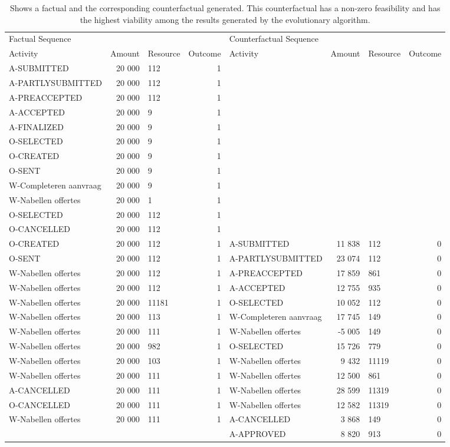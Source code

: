 \begin{table}
\caption{Shows a factual and the corresponding counterfactual generated. This counterfactual has a non-zero feasibility and has the highest viability among the results generated by the evolutionary algorithm.}
\label{tbl:example-cf-evo-feasibility}
\begin{tabular}{lrlrlrlr}
\toprule
\multicolumn{4}{l}{Factual Sequence} & \multicolumn{4}{l}{Counterfactual Sequence} \\
Activity & Amount & Resource & Outcome & Activity & Amount & Resource & Outcome \\
\midrule
A-SUBMITTED & 20 000 & 112 & 1 &  &  &  &  \\
A-PARTLYSUBMITTED & 20 000 & 112 & 1 &  &  &  &  \\
A-PREACCEPTED & 20 000 & 112 & 1 &  &  &  &  \\
A-ACCEPTED & 20 000 & 9 & 1 &  &  &  &  \\
A-FINALIZED & 20 000 & 9 & 1 &  &  &  &  \\
O-SELECTED & 20 000 & 9 & 1 &  &  &  &  \\
O-CREATED & 20 000 & 9 & 1 &  &  &  &  \\
O-SENT & 20 000 & 9 & 1 &  &  &  &  \\
W-Completeren aanvraag & 20 000 & 9 & 1 &  &  &  &  \\
W-Nabellen offertes & 20 000 & 1 & 1 &  &  &  &  \\
O-SELECTED & 20 000 & 112 & 1 &  &  &  &  \\
O-CANCELLED & 20 000 & 112 & 1 &  &  &  &  \\
O-CREATED & 20 000 & 112 & 1 & A-SUBMITTED & 11 838 & 112 & 0 \\
O-SENT & 20 000 & 112 & 1 & A-PARTLYSUBMITTED & 23 074 & 112 & 0 \\
W-Nabellen offertes & 20 000 & 112 & 1 & A-PREACCEPTED & 17 859 & 861 & 0 \\
W-Nabellen offertes & 20 000 & 112 & 1 & A-ACCEPTED & 12 755 & 935 & 0 \\
W-Nabellen offertes & 20 000 & 11181 & 1 & O-SELECTED & 10 052 & 112 & 0 \\
W-Nabellen offertes & 20 000 & 113 & 1 & W-Completeren aanvraag & 17 745 & 149 & 0 \\
W-Nabellen offertes & 20 000 & 111 & 1 & W-Nabellen offertes & -5 005 & 149 & 0 \\
W-Nabellen offertes & 20 000 & 982 & 1 & O-SELECTED & 15 726 & 779 & 0 \\
W-Nabellen offertes & 20 000 & 103 & 1 & W-Nabellen offertes & 9 432 & 11119 & 0 \\
W-Nabellen offertes & 20 000 & 111 & 1 & W-Nabellen offertes & 12 500 & 861 & 0 \\
A-CANCELLED & 20 000 & 111 & 1 & W-Nabellen offertes & 28 599 & 11319 & 0 \\
O-CANCELLED & 20 000 & 111 & 1 & W-Nabellen offertes & 12 582 & 11319 & 0 \\
W-Nabellen offertes & 20 000 & 111 & 1 & A-CANCELLED & 3 868 & 149 & 0 \\
 &  &  &  & A-APPROVED & 8 820 & 913 & 0 \\
\bottomrule
\end{tabular}
\end{table}
